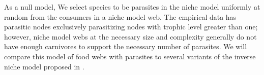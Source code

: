 \documentclass[/home/nkappler/Research/Dissertation/
 dissertation.tex]{subfiles}
\begin{document}
\begin{bibunit}
As a null model, We select species to be parasites in the niche model uniformly
at random from the consumers in a niche model web. The empirical data has
parasitic nodes exclusively parasitizing nodes with trophic level greater than
one; however, niche model webs at the necessary size and complexity generally
do not have enough carnivores to support the necessary number of parasites. We
will compare this model of food webs with parasites to several variants of the
inverse niche model proposed in \cite{Warren2010}.





\end{bibunit}
\end{document}

